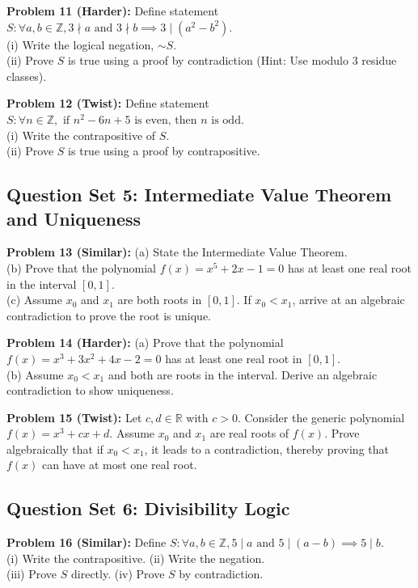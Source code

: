 \documentclass{article}
\begin{document}
\noindent\textbf{Problem 11 (Harder):} Define statement $S: \forall a,b \in \mathbb{Z}, 3 \nmid a \text{ and } 3 \nmid b \implies 3 \mid (a^2-b^2)$. \\
(i) Write the logical negation, $\sim S$. \\
(ii) Prove $S$ is true using a proof by contradiction (Hint: Use modulo 3 residue classes).

\noindent\textbf{Problem 12 (Twist):} Define statement $S: \forall n \in \mathbb{Z}, \text{ if } n^2 - 6n + 5 \text{ is even, then } n \text{ is odd}$. \\
(i) Write the contrapositive of $S$. \\
(ii) Prove $S$ is true using a proof by contrapositive.

\subsection{Question Set 5: Intermediate Value Theorem and Uniqueness}
\noindent\textbf{Problem 13 (Similar):} 
(a) State the Intermediate Value Theorem. \\
(b) Prove that the polynomial $f(x) = x^5+2x-1 = 0$ has at least one real root in the interval $[0,1]$. \\
(c) Assume $x_0$ and $x_1$ are both roots in $[0,1]$. If $x_0 < x_1$, arrive at an algebraic contradiction to prove the root is unique.

\noindent\textbf{Problem 14 (Harder):} 
(a) Prove that the polynomial $f(x) = x^3+3x^2+4x-2 = 0$ has at least one real root in $[0,1]$. \\
(b) Assume $x_0 < x_1$ and both are roots in the interval. Derive an algebraic contradiction to show uniqueness.

\noindent\textbf{Problem 15 (Twist):} 
Let $c, d \in \mathbb{R}$ with $c > 0$. Consider the generic polynomial $f(x) = x^3 + cx + d$. 
Assume $x_0$ and $x_1$ are real roots of $f(x)$. Prove algebraically that if $x_0 < x_1$, it leads to a contradiction, thereby proving that $f(x)$ can have at most one real root.

\subsection{Question Set 6: Divisibility Logic}
\noindent\textbf{Problem 16 (Similar):} Define $S: \forall a,b \in \mathbb{Z}, 5 \mid a \text{ and } 5 \mid (a-b) \implies 5 \mid b$. \\
(i) Write the contrapositive. (ii) Write the negation. \\
(iii) Prove $S$ directly. (iv) Prove $S$ by contradiction.
\end{document}
